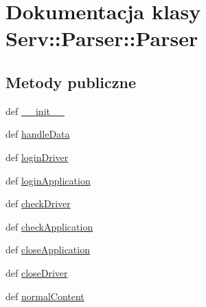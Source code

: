 \hypertarget{class_serv_1_1_parser_1_1_parser}{
\section{Dokumentacja klasy Serv::Parser::Parser}
\label{class_serv_1_1_parser_1_1_parser}
}
\subsection*{Metody publiczne}
\begin{CompactItemize}
\item 
def \hyperlink{class_serv_1_1_parser_1_1_parser_8627f07c762983eff029ad167a021e38}{\_\-\_\-init\_\-\_\-}
\item 
def \hyperlink{class_serv_1_1_parser_1_1_parser_060ed5ba3cbf55b63ecc3f3aa006da04}{handleData}
\item 
def \hyperlink{class_serv_1_1_parser_1_1_parser_e092cef5abd35ec04fa61e71377e1303}{loginDriver}
\item 
def \hyperlink{class_serv_1_1_parser_1_1_parser_ec3286787a7c8642127416c77e1c2c8f}{loginApplication}
\item 
def \hyperlink{class_serv_1_1_parser_1_1_parser_a6c504eb2ef2712d8f05cec0e94f3eba}{checkDriver}
\item 
def \hyperlink{class_serv_1_1_parser_1_1_parser_8c0d6b83193d0e972e50887c7640181d}{checkApplication}
\item 
def \hyperlink{class_serv_1_1_parser_1_1_parser_fc14060e753dc6d502e33a46b168f6c0}{closeApplication}
\item 
def \hyperlink{class_serv_1_1_parser_1_1_parser_1e840af17ebce4b0a649dcebb10ba0dd}{closeDriver}
\item 
def \hyperlink{class_serv_1_1_parser_1_1_parser_dc1da4d6ff7eb9dbc114f8a426274aa0}{normalContent}
\end{CompactItemize}
